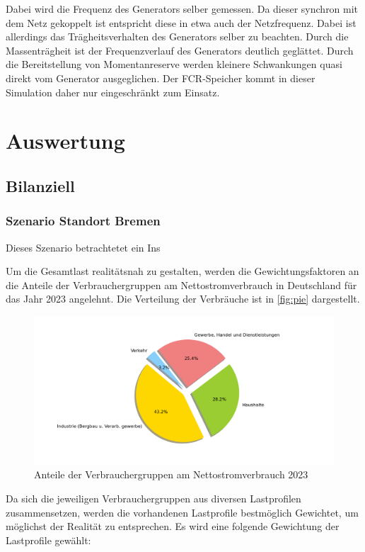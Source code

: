 Dabei wird die Frequenz des Generators selber gemessen.
Da dieser synchron mit dem Netz gekoppelt ist entspricht diese in etwa auch der Netzfrequenz.
Dabei ist allerdings das Trägheitsverhalten des Generators selber zu beachten.
Durch die Massenträgheit ist der Frequenzverlauf des Generators deutlich geglättet.
Durch die Bereitstellung von Momentanreserve werden kleinere Schwankungen quasi direkt vom Generator ausgeglichen.
Der FCR-Speicher kommt in dieser Simulation daher nur eingeschränkt zum Einsatz.



\chapter{Auswertung}

\section{Bilanziell}




\subsection{Szenario Standort Bremen}

Dieses Szenario betrachtetet ein Ins

Um die Gesamtlast realitätsnah zu gestalten, werden die Gewichtungsfaktoren an die Anteile der Verbrauchergruppen am Nettostromverbrauch in Deutschland für das Jahr 2023 angelehnt. Die Verteilung der Verbräuche ist in \autoref{fig:pie} dargestellt.

\begin{figure}[H]
	\centering
	\includegraphics[width=0.8\linewidth]{Abbildungen/Stromverbrauch.png}
	\caption{Anteile der Verbrauchergruppen am Nettostromverbrauch 2023}
	\label{fig:pie}
\end{figure}

Da sich die jeweiligen Verbrauchergruppen aus diversen Lastprofilen zusammensetzen, werden die vorhandenen Lastprofile bestmöglich Gewichtet, um möglichst der Realität zu entsprechen. Es wird eine folgende Gewichtung der Lastprofile gewählt:

